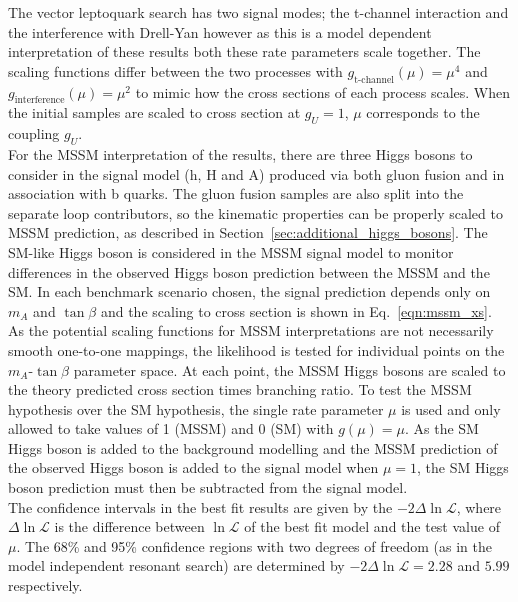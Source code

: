 The vector leptoquark search has two signal modes; the t-channel interaction and the interference with Drell-Yan however as this is a model dependent interpretation of these results both these rate parameters scale together.
The scaling functions differ between the two processes with $g_{\text{t-channel}}(\mu) = \mu^4$ and $g_{\text{interference}}(\mu) = \mu^2$ to mimic how the cross sections of each process scales.
When the initial samples are scaled to cross section at $g_{U}=1$, $\mu$ corresponds to the coupling $g_{U}$. \\

For the MSSM interpretation of the results, there are three Higgs bosons to consider in the signal model (h, H and A) produced via both gluon fusion and in association with b quarks.
The gluon fusion samples are also split into the separate loop contributors, so the kinematic properties can be properly scaled to MSSM prediction, as described in Section~\ref{sec:additional_higgs_bosons}.
The SM-like Higgs boson is considered in the MSSM signal model to monitor differences in the observed Higgs boson prediction between the MSSM and the SM.
In each benchmark scenario chosen, the signal prediction depends only on $m_{A}$ and $\tan\beta$ and the scaling to cross section is shown in Eq.~\ref{eqn:mssm_xs}.
As the potential scaling functions for MSSM interpretations are not necessarily smooth one-to-one mappings, the likelihood is tested for individual points on the $m_{A}$-$\tan\beta$ parameter space.
At each point, the MSSM Higgs bosons are scaled to the theory predicted cross section times branching ratio.
To test the MSSM hypothesis over the SM hypothesis, the single rate parameter $\mu$ is used and only allowed to take values of 1 (MSSM) and 0 (SM) with $g(\mu)=\mu$.
As the SM Higgs boson is added to the background modelling and the MSSM prediction of the observed Higgs boson is added to the signal model when $\mu=1$, the SM Higgs boson prediction must then be subtracted from the signal model. \\

The confidence intervals in the best fit results are given by the $-2\Delta\ln\mathcal{L}$, where $\Delta\ln\mathcal{L}$ is the difference between $\ln\mathcal{L}$ of the best fit model and the test value of $\mu$. 
The 68\% and 95\% confidence regions with two degrees of freedom (as in the model independent resonant search) are determined by $-2\Delta\ln\mathcal{L} = 2.28$ and $5.99$ respectively. \\

